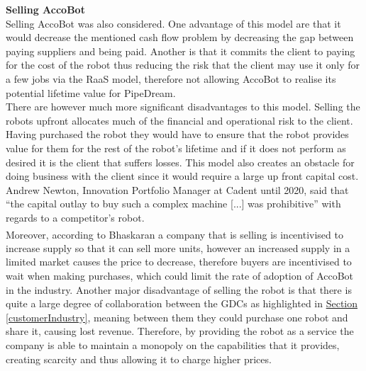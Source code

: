 \documentclass[11pt]{article}		%
\newcommand{\supercite}[1]{\textsuperscript{\cite{#1}}}		%
\newcommand{\sectref}[1]{\hyperref[#1]{Section \ref*{#1}}}     %
\begin{document}
            \textbf{Selling AccoBot}%
            \\
            Selling AccoBot was also considered.
            One advantage of this model are that it would decrease the mentioned cash flow problem by decreasing the gap between paying suppliers and being paid. Another is that it commits the client to paying for the cost of the robot thus reducing the risk that the client may use it only for a few jobs via the RaaS model, therefore not allowing AccoBot to realise its potential lifetime value for PipeDream.
            \\
            \hspace*{3ex}There are however much more significant disadvantages to this model. Selling the robots upfront allocates much of the financial and operational risk to the client. Having purchased the robot they would have to ensure that the robot provides value for them for the rest of the robot’s lifetime and if it does not perform as desired it is the client that suffers losses. This model also creates an obstacle for doing business with the client since it would require a large up front capital cost. Andrew Newton, Innovation Portfolio Manager at Cadent until 2020, said that “the capital outlay to buy such a complex machine [...] was prohibitive” with regards to a competitor’s robot. 
            \\
            \hspace*{3ex}Moreover, according to Bhaskaran\supercite{leasing_strategy} a company that is selling is incentivised to increase supply so that it can sell more units, however an increased supply in a limited market causes the price to decrease, therefore buyers are incentivised to wait when making purchases, which could limit the rate of adoption of AccoBot in the industry. Another major disadvantage of selling the robot is that there is quite a large degree of collaboration between the GDCs as highlighted in \sectref{customerIndustry}, meaning between them they could purchase one robot and share it, causing lost revenue. Therefore, by providing the robot as a service the company is able to maintain a monopoly on the capabilities that it provides, creating scarcity and thus allowing it to charge higher prices.
\end{document}
